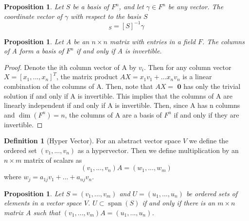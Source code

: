 \documentclass[12pt]{article}
\newtheorem{prop}[thm]{Proposition}
\theoremstyle{definition}
\newtheorem{defn}[thm]{Definition}
\theoremstyle{remark}
\numberwithin{equation}{section}
\newcommand\B[1]{\textbf{ #1}}
\DeclareMathOperator{\spn}{span}
\begin{document}
\vspace{15pt}

\begin{prop}
        Let $S$ be a basis of $F^n$, and let $\gamma \in F^n$ be any vector. The coordinate vector of $\gamma$ with respect to the basis $S$ \begin{equation}
                [\gamma]_S = [S]^{-1}\gamma
        \end{equation}
\end{prop}

\vspace{15pt}


\begin{prop}
        Let A be an $n\times n$ matrix with entries in a field $F$. The columns of A form a basis of $F^n$ if and only if A is invertible.
\end{prop}

\begin{proof}
        Denote the ith column vector of A by $v_i$. Then for any column vector $X = [x_1,...,x_n]^T$, the matrix product $AX = x_1v_1+...x_nv_n$ is a linear combination of the columns of A. Then, note that $AX = \B{0}$ has only the trivial solution if and only if A is invertible. This implies that the columns of A are linearly independent if and only if A is invertible. Then, since A has n columns and $\dim(F^n) = n$, the columns of A are a basis of $F^n$ if and only if they are invertible.
\end{proof}

\vspace{15pt}

\begin{defn}[Hyper Vector]
        For an abstract vector space $V$ we define the ordered set $(v_1,...,v_n)$ as a hypervector. Then we define multiplication by an $n \times m$ matrix of scalars as \begin{equation}
                (v_1,...,v_n)A = (w_1,...,w_m)
        \end{equation}
        where $w_j = a_{1j}v_1+...+a_{nj}v_n$.
\end{defn}

\vspace{15pt}

\begin{prop}
        Let $S = (v_1,...,v_m)$ and $U = (u_1,...,u_n)$ be ordered sets of elements in a vector space $V$. $U \subset \spn(S)$ if and only if there is an $m\times n$ matrix A such that $(v_1,...,v_m)A = (u_1,...,u_n)$.
\end{prop}
\end{document}
